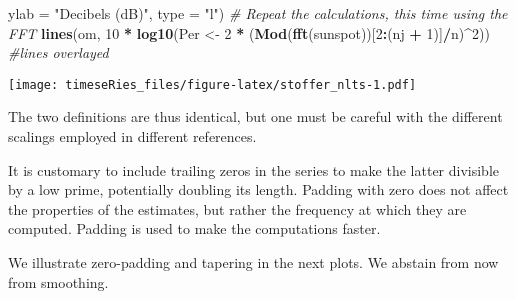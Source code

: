 \documentclass[]{book}
\newenvironment{Shaded}{\begin{snugshade}}{\end{snugshade}}
\newcommand{\CommentTok}[1]{\textcolor[rgb]{0.56,0.35,0.01}{\textit{#1}}}
\newcommand{\DataTypeTok}[1]{\textcolor[rgb]{0.13,0.29,0.53}{#1}}
\newcommand{\DecValTok}[1]{\textcolor[rgb]{0.00,0.00,0.81}{#1}}
\newcommand{\KeywordTok}[1]{\textcolor[rgb]{0.13,0.29,0.53}{\textbf{#1}}}
\newcommand{\NormalTok}[1]{#1}
\newcommand{\OperatorTok}[1]{\textcolor[rgb]{0.81,0.36,0.00}{\textbf{#1}}}
\newcommand{\StringTok}[1]{\textcolor[rgb]{0.31,0.60,0.02}{#1}}
\begin{document}
\begin{Shaded}
\begin{Highlighting}[]
    \DataTypeTok{ylab =} \StringTok{"Decibels (dB)"}\NormalTok{, }\DataTypeTok{type =} \StringTok{"l"}\NormalTok{)}
\CommentTok{# Repeat the calculations, this time using the FFT}
\KeywordTok{lines}\NormalTok{(om, }\DecValTok{10} \OperatorTok{*}\StringTok{ }\KeywordTok{log10}\NormalTok{(Per <-}\StringTok{ }\DecValTok{2} \OperatorTok{*}\StringTok{ }\NormalTok{(}\KeywordTok{Mod}\NormalTok{(}\KeywordTok{fft}\NormalTok{(sunspot))[}\DecValTok{2}\OperatorTok{:}\NormalTok{(nj }\OperatorTok{+}\StringTok{ }\DecValTok{1}\NormalTok{)]}\OperatorTok{/}\NormalTok{n)}\OperatorTok{^}\DecValTok{2}\NormalTok{))  }\CommentTok{#lines overlayed}
\end{Highlighting}
\end{Shaded}

\texttt{[image: timeseRies\_files/figure-latex/stoffer\_nlts-1.pdf]}

The two definitions are thus identical, but one must be careful with the
different scalings employed in different references.

It is customary to include trailing zeros in the series to make the
latter divisible by a low prime, potentially doubling its length.
Padding with zero does not affect the properties of the estimates, but
rather the frequency at which they are computed. Padding is used to make
the computations faster.

We illustrate zero-padding and tapering in the next plots. We abstain
from now from smoothing.
\end{document}
